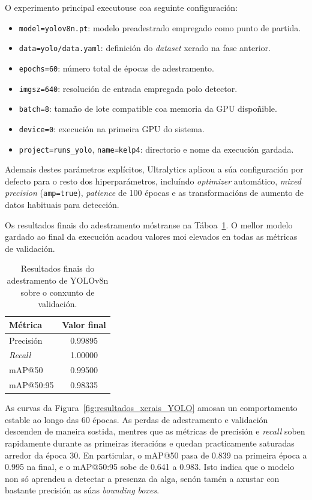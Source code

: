 O experimento principal executouse coa seguinte configuración:
\begin{itemize}
    \item \texttt{model=yolov8n.pt}: modelo preadestrado empregado como punto de partida.
    \item \texttt{data=yolo/data.yaml}: definición do \textit{dataset} xerado na fase anterior.
    \item \texttt{epochs=60}: número total de épocas de adestramento.
    \item \texttt{imgsz=640}: resolución de entrada empregada polo detector.
    \item \texttt{batch=8}: tamaño de lote compatible coa memoria da GPU dispoñible.
    \item \texttt{device=0}: execución na primeira GPU do sistema.
    \item \texttt{project=runs\_yolo}, \texttt{name=kelp4}: directorio e nome da execución gardada.
\end{itemize}

Ademais destes parámetros explícitos, Ultralytics aplicou a súa configuración por defecto para o
resto dos hiperparámetros, incluíndo \textit{optimizer} automático, \textit{mixed precision}
(\texttt{amp=true}), \textit{patience} de 100 épocas e as transformacións de aumento de datos
habituais para detección.

Os resultados finais do adestramento móstranse na Táboa~\ref{tab:resultados-yolo}. O mellor modelo
gardado ao final da execución acadou valores moi elevados en todas as métricas de validación.

{
\begin{table}[htbp]
  \centering
  \begin{tabular}{l|c}
  \rowcolor{udcpink!25}
  \textbf{Métrica} & \textbf{Valor final} \\\hline
  Precisión & 0.99895 \\
  \textit{Recall} & 1.00000 \\
  mAP@50 & 0.99500 \\
  mAP@50:95 & 0.98335 \\
  \end{tabular}
  \caption{Resultados finais do adestramento de YOLOv8n sobre o conxunto de validación.}
  \label{tab:resultados-yolo}
\end{table}
}

As curvas da Figura~\ref{fig:resultados_xerais_YOLO} amosan un comportamento estable ao longo das
60 épocas. As perdas de adestramento e validación descenden de maneira sostida, mentres que as
métricas de precisión e \textit{recall} soben rapidamente durante as primeiras iteracións e quedan
practicamente saturadas arredor da época 30. En particular, o mAP@50 pasa de 0.839 na primeira
época a 0.995 na final, e o mAP@50:95 sobe de 0.641 a 0.983. Isto indica que o modelo non só
aprendeu a detectar a presenza da alga, senón tamén a axustar con bastante precisión as súas
\textit{bounding boxes}.

